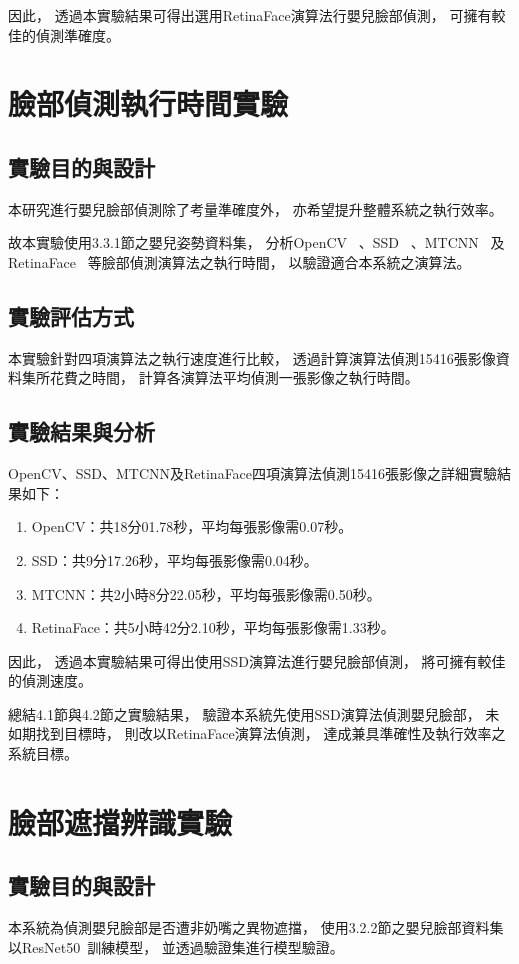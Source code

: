 \documentclass[class=NCU_thesis, crop=false]{standalone}
\begin{document}
因此，
透過本實驗結果可得出選用RetinaFace演算法行嬰兒臉部偵測，
可擁有較佳的偵測準確度。

\section{臉部偵測執行時間實驗}
\subsection{實驗目的與設計}
本研究進行嬰兒臉部偵測除了考量準確度外，
亦希望提升整體系統之執行效率。

故本實驗使用3.3.1節之嬰兒姿勢資料集，
分析OpenCV~\cite{goyal_face_2017}
、SSD~\cite{ye_face_2021}
、MTCNN~\cite{zhang_joint_2016}
及RetinaFace~\cite{deng_retinaface_2020}
等臉部偵測演算法之執行時間，
以驗證適合本系統之演算法。

\subsection{實驗評估方式}
本實驗針對四項演算法之執行速度進行比較，
透過計算演算法偵測15416張影像資料集所花費之時間，
計算各演算法平均偵測一張影像之執行時間。

\subsection{實驗結果與分析}
OpenCV、SSD、MTCNN及RetinaFace四項演算法偵測15416張影像之詳細實驗結果如下：
\begin{enumerate}
    \item OpenCV：共18分01.78秒，平均每張影像需0.07秒。
    \item SSD：共9分17.26秒，平均每張影像需0.04秒。
    \item MTCNN：共2小時8分22.05秒，平均每張影像需0.50秒。
    \item RetinaFace：共5小時42分2.10秒，平均每張影像需1.33秒。
\end{enumerate}

因此，
透過本實驗結果可得出使用SSD演算法進行嬰兒臉部偵測，
將可擁有較佳的偵測速度。

總結4.1節與4.2節之實驗結果，
驗證本系統先使用SSD演算法偵測嬰兒臉部，
未如期找到目標時，
則改以RetinaFace演算法偵測，
達成兼具準確性及執行效率之系統目標。

\section{臉部遮擋辨識實驗}
\subsection{實驗目的與設計}
本系統為偵測嬰兒臉部是否遭非奶嘴之異物遮擋，
使用3.2.2節之嬰兒臉部資料集以ResNet50~\cite{he_deep_2016}訓練模型，
並透過驗證集進行模型驗證。
\end{document}
